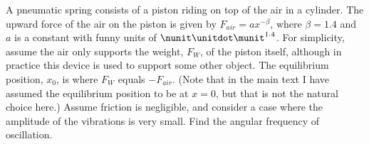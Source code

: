  A pneumatic spring consists of a piston riding on top
of the air in a cylinder. The upward force of the air on
the piston is given by $F_{air}=ax^{-\beta}$, where $\beta=1.4$ and $a$ is a
constant with funny units of $\nunit\unitdot\munit^{1.4}$. For simplicity,
assume the air only supports the weight, $F_W$, of the
piston itself, although in practice this device is used to
support some other object. The equilibrium position, $x_0$,
is where $F_W$ equals $-F_{air}$. (Note that in the main
text I have assumed the equilibrium position to be at $x=0$,
but that is not the natural choice here.) Assume friction
is negligible, and consider a case where the amplitude of
the vibrations is very small. Find the angular frequency of oscillation.\answercheck
